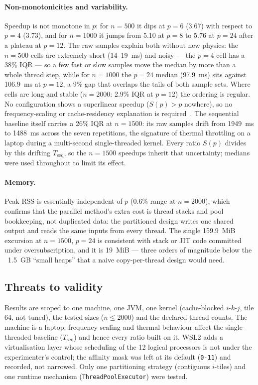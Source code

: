 \documentclass[11pt,a4paper]{article}
\begin{document}
\paragraph{Non-monotonicities and variability.}
Speedup is not monotone in $p$: for $n = 500$ it dips at $p = 6$ (3.67)
with respect to $p = 4$ (3.73), and for $n = 1000$ it jumps from 5.10 at
$p = 8$ to 5.76 at $p = 24$ after a plateau at $p = 12$. The raw samples
explain both without new physics: the $n = 500$ cells are extremely short
(14--19~ms) and noisy --- the $p = 4$ cell has a 38\% IQR --- so a few
fast or slow samples move the median by more than a whole thread step,
while for $n = 1000$ the $p = 24$ median (97.9~ms) sits against 106.9~ms
at $p = 12$, a 9\% gap that overlaps the tails of both sample sets.
Where cells are long and stable ($n = 2000$: 2.9\% IQR at $p = 12$) the
ordering is regular. No configuration shows a superlinear speedup
($S(p) > p$ nowhere), so no frequency-scaling or cache-residency
explanation is required~\cite{hill2008}. The sequential baseline itself
carries a 26\% IQR at $n = 1500$: its raw samples drift from 1949~ms to
1488~ms across the seven repetitions, the signature of thermal throttling
on a laptop during a multi-second single-threaded kernel. Every ratio
$S(p)$ divides by this drifting $T_{\mathrm{seq}}$, so the $n = 1500$
speedups inherit that uncertainty; medians were used throughout to limit
its effect.

\paragraph{Memory.}
Peak RSS is essentially independent of $p$ (0.6\% range at $n = 2000$),
which confirms that the parallel method's extra cost is thread stacks and
pool bookkeeping, not duplicated data: the partitioned design writes one
shared output and reads the same inputs from every thread. The single
159.9~MiB excursion at $n = 1500$, $p = 24$ is consistent with stack or
JIT code committed under oversubscription, and it is 19~MiB --- three
orders of magnitude below the ~1.5~GB ``small heaps'' that a naive
copy-per-thread design would need.

\subsection{Threats to validity}

Results are scoped to one machine, one JVM, one kernel (cache-blocked
$i$-$k$-$j$, tile 64, not tuned), the tested sizes ($n \le 2000$) and the
declared thread counts. The machine is a laptop: frequency scaling and
thermal behaviour affect the single-threaded baseline
($T_{\mathrm{seq}}$) and hence every ratio built on it. WSL2 adds a
virtualisation layer whose scheduling of the 12 logical processors is not
under the experimenter's control; the affinity mask was left at its
default (\texttt{0-11}) and recorded, not narrowed. Only one partitioning
strategy (contiguous $i$-tiles) and one runtime mechanism
(\texttt{ThreadPoolExecutor}) were tested.
\end{document}
